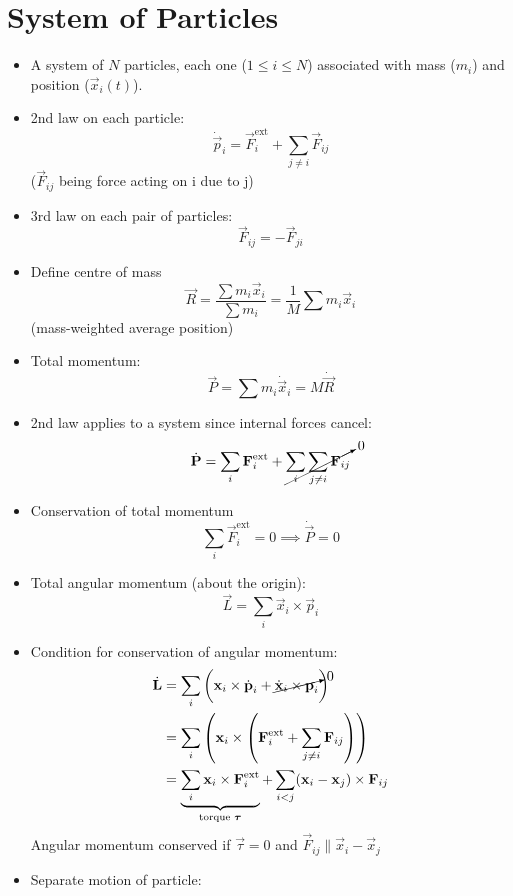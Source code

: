 \section{System of Particles}
\begin{itemize}

    \item A system of $N$ particles, each one ($1 \leq i \leq N$) associated with mass ($m_i$) and position ($\vec{x}_i(t)$).
    \item 2nd law on each particle: \[\dot{\vec{p}}_i = \vec{F}^{\text{ext}}_i + \sum_{j\neq i} \vec{F}_{ij} \] ($\vec{F}_{ij}$ being force acting on i due to j)
    \item 3rd law on each pair of particles: \[\vec{F}_{ij} = -\vec{F}_{ji}\]
    \item Define centre of mass \[ \vec{R} = \frac{\sum m_i \vec{x}_i}{\sum m_i} = \frac{1}{M} \sum m_i \vec{x}_i \]
          (mass-weighted average position)
    \item Total momentum: \[\vec{P} = \sum m_i \dot{\vec{x}}_i = M \dot{\vec{R}} \]
    \item 2nd law applies to a system since internal forces cancel:
          \[ \dot{\vec{P}} = \sum_i \vec{F}^{\text{ext}}_i + \cancelto{0}{\sum_i \sum_{j\neq i} \vec{F}_{ij}} \]
    \item Conservation of total momentum \[ \sum_i \vec{F}^{\text{ext}}_i = 0 \implies \dot{\vec{P}} = 0 \]
    \item Total angular momentum (about the origin):
          \[\vec{L} = \sum_i \vec{x}_i \times \vec{p}_i\]
    \item Condition for conservation of angular momentum:
          \begin{align*}
              \dot{\vec{L}} & = \sum_i \left( \vec{x}_i \times \dot{\vec{p}}_i + \cancelto{0}{\dot{\vec{x}}_i \times \vec{p}_i} \right)                                        \\
                            & = \sum_i \left( \vec{x}_i \times \left(\vec{F}^{\text{ext}}_i + \sum_{j\neq i} \vec{F}_{ij}\right) \right)                                       \\
                            & = \underbrace{\sum_i \vec{x}_i \times \vec{F}^{\text{ext}}_i}_{\text{torque } \vec{\tau}} + \sum_{i<j} (\vec{x}_i-\vec{x}_j) \times \vec{F}_{ij}
          \end{align*}
          Angular momentum conserved if $ \vec{\tau} =0$ and $\vec{F}_{ij} \parallel \vec{x}_i-\vec{x}_j$
    \item Separate motion of particle:

\end{itemize}
